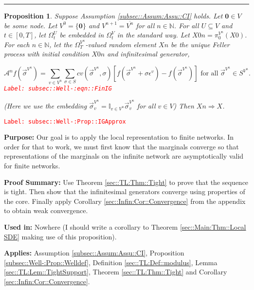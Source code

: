 \documentclass[12pt]{article}
\newcommand{\mb}{\mathbb}
\newcommand{\mc}{\mathcal}
\newcommand{\ov}{\overline}
\newcommand{\te}{\text}
\newcommand{\ep}{\epsilon}
\newcommand{\tr}{\textcolor{red}}
\newcommand{\labe}[1]{\tr{\texttt{Label: #1}}}
\newcommand{\purpose}{\textbf{Purpose: }}
\newcommand{\pfsum}{\textbf{Proof Summary: }}
\newcommand{\usein}{\textbf{Used in: }}
\newcommand{\app}{\textbf{Applies: }}
\newcommand{\lin}{\rule{\linewidth}{0.4 pt}}
\renewcommand{\root}{\mathbf{0}}				%
\renewcommand{\v}{v}							%
\renewcommand{\U}{U}							%
\renewcommand{\S}{S}							%
\newcommand{\s}{\sigma}							%
\newcommand{\sv}{\vec{\s}}						%
\newcommand{\ev}{\ep}							%
\newcommand{\T}{T}								%
\renewcommand{\t}{t}							%
\newcommand{\sset}{\Omega}						%
\newcommand{\proj}{\pi}							%
\newcommand{\X}{X}								%
\newcommand{\IG}{\mc{A}}						%
\newcommand{\IGr}{c}							%
\newcommand{\vind}[1]{^{#1}}					%
\newcommand{\carp}[1]{^{#1}}					%
\newcommand{\vsi}[1]{^{#1}}						%
\newcommand{\cind}[1]{_{#1}}					%
\newcommand{\cl}{\ov}							%
\newcommand{\ts}[1]{_{#1}}						%
\newcommand{\sln}[1]{^{#1}}						%
\newtheorem{prop}[thms]{Proposition}
\begin{document}
\lin

\begin{prop}
Suppose Assumption \ref{subsec::Assum:Assu::CI} holds. Let \(\root \in V\) be some node. Let \(V\sln{0} = \{\root\}\) and \(V\sln{n+1} = \cl{V\sln{n}}\) for all \(n \in \mb{N}\). For all \(\U \subseteq V\) and \(\t \in [0,\T]\), let \(\sset\vsi{\U}\ts{\t}\) be embedded in \(\sset\vsi{V}\ts{\t}\) in the standard way. Let \(\X{}{0}{n} = \proj\vsi{V\sln{n}}\ts{0}(\X{}{0})\). For each \(n\in\mb{N}\), let the \(\sset\vsi{V\sln{n}}\ts{\T}\)-valued random element \(\X{}{}{n}\) be the unique Feller process with initial condition \(\X{}{0}{n}\) and infinitesimal generator,

\begin{equation}
\IG\sln{n}f(\sv\cind{}\vsi{V\sln{n}}) = \sum_{\v\in V\sln{n}}\sum_{\s\in \S} \IGr{\v}(\sv\cind{}\vsi{V\sln{n}}, \s)[f(\sv\cind{}\vsi{V\sln{n}} + \s\ev\vind{\v}) - f(\sv\cind{}\vsi{V\sln{n}})]\te{ for all } \sv\cind{}\vsi{V\sln{n}} \in \S\carp{V\sln{n}}.
\label{subsec::Well-:eqn::FinIG}
\end{equation}
\labe{subsec::Well-:eqn::FinIG}

(Here we use the embedding \(\sv\cind{\v}\vsi{V\sln{n}} = \mb{I}_{\v\in V\sln{n}} \sv\cind{\v}\vsi{V\sln{n}}\) for all \(\v \in V\)) Then \(\X{}{}{n} \Rightarrow \X{}{}\).
\label{subsec::Well-:Prop::IGApprox}
\end{prop}
\labe{subsec::Well-:Prop::IGApprox}

\purpose Our goal is to apply the local representation to finite networks. In order for that to work, we must first know that the marginals converge so that representations of the marginals on the infinite network are asymptotically valid for finite networks.

\pfsum Use Theorem \ref{sec::TL:Thm::Tight} to prove that the sequence is tight. Then show that the infinitesimal generators converge using properties of the core. Finally apply Corollary \ref{sec::Infin:Cor::Convergence} from the appendix to obtain weak convergence.

\usein Nowhere (I should write a corollary to Theorem \ref{sec::Main:Thm::Local SDE} making use of this proposition).

\app Assumption \ref{subsec::Assum:Assu::CI}, Proposition \ref{subsec::Well-:Prop::Welldef}, Definition \ref{sec::TL:Def::modulus}, Lemma \ref{sec::TL:Lem::TightSupport}, Theorem \ref{sec::TL:Thm::Tight} and Corollary \ref{sec::Infin:Cor::Convergence}.
\end{document}
